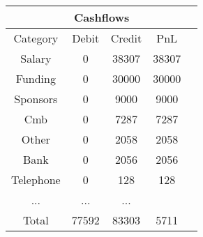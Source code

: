 \begin{longtable}{|c|c|c|c|c|}
\hline
\multicolumn{5}{|c|}{Cashflows} \\
\hline
Category & Debit & Credit & PnL \\
\hline
Salary & 0 & 38307 & 38307\\
\hline
Funding & 0 & 30000 & 30000\\
\hline
Sponsors & 0 & 9000 & 9000\\
\hline
Cmb & 0 & 7287 & 7287\\
\hline
Other & 0 & 2058 & 2058\\
\hline
Bank & 0 & 2056 & 2056\\
\hline
Telephone & 0 & 128 & 128\\
\hline
 ... & ... & ...\\
\hline
 Total & 77592 & 83303 & 5711 \\
\hline
\end{longtable}
